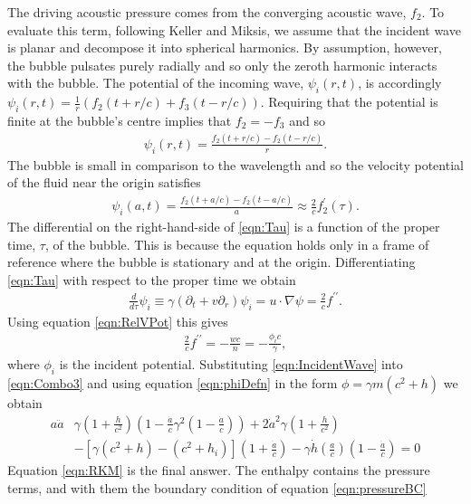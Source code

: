 \documentclass[10pt, fleqn,draft,showtrims,oldfontcommands]{article} %
\newcommand{\eqnref}[1]{\ref{eqn:#1}}
\newcommand{\lr}[1]{\left( #1 \right)}
\newcommand{\lrsquare}[1]{\left[ #1 \right]}
\newcommand{\dprime}{{\prime\prime}}
\renewcommand{\d}{\partial}
\newcommand{\del}{\nabla}
\newcommand{\dr}{{\d_r}}
\begin{document}
The driving acoustic pressure comes from the converging acoustic wave, $f_2$.
To evaluate this term, following Keller and Miksis, 
we assume that the incident wave is planar and decompose it into  spherical harmonics.
By assumption, however, the bubble pulsates purely radially and so only the zeroth harmonic interacts with the bubble.
The potential of the incoming wave, $\psi_i (r,t)$, is accordingly 
  $\psi_i (r,t) = \frac{1}{r}\lr{f_2(t+r/c) + f_3(t-r/c)}$.
Requiring that the potential is finite at the bubble's centre implies that  $f_2 = -f_3$ and so
\begin{align}
  \psi_i (r,t) = \frac{f_2(t+r/c) - f_2(t-r/c)}{r}.
\end{align}
The bubble is small in comparison to the wavelength and so the velocity potential of the fluid near the origin satisfies
\begin{align}
  \label{eqn:Tau}
 \psi_i (a,t) = \frac{f_2(t+a/c) - f_2(t-a/c)}{a} \approx \frac{2}{c}f_2^\prime(\tau).
\end{align}
The differential on the right-hand-side of \eqnref{Tau} is a function of the proper time, $\tau$, of the bubble.
This is because the equation holds only in a frame of reference where the bubble is stationary and at the origin.
Differentiating \eqnref{Tau} with respect to the proper time we obtain
\begin{align}
  \frac{d}{d \tau} \psi_i \equiv \gamma \lr{\d_t+ v\dr } \psi_i = u \cdot \del \psi = \frac{2}{c}f^\dprime.
\end{align}
Using equation \eqnref{RelVPot}  this gives
\begin{align}
\frac{2}{c}f^\dprime =-\frac{wc}{n}= - \frac{\phi_i c}{\gamma}, \label{eqn:IncidentWave}
\end{align}
where $\phi_i$ is the incident  potential.
Substituting  \eqnref{IncidentWave} into \eqnref{Combo3} and using equation \eqnref{phiDefn} in the form $\phi = \gamma m\lr{c^2 + h}$ we obtain
\begin{align}
  a \ddot a & \gamma \lr{1 + \frac{h}{c^2}}\lr{1 - \frac{\dot a}{c}\gamma^2\lr{1- \frac{\dot a}{c}}}+ 2 {\dot a}^2\gamma\lr{1 + \frac{h}{c^2}}\nonumber\\
  &- \lrsquare{\gamma\lr{c^2 + h} - \lr{c^2 + h_i}}\lr{1 + \frac{\dot a}{c}}- \gamma \dot h \lr{\frac{a}{c}}\lr{1 - \frac{\dot a}{c}}
= 0\label{eqn:RKM}
\end{align}
Equation \eqnref{RKM} is the final answer. The enthalpy contains the pressure terms, and with them the boundary condition of equation \eqnref{pressureBC}
\end{document}
